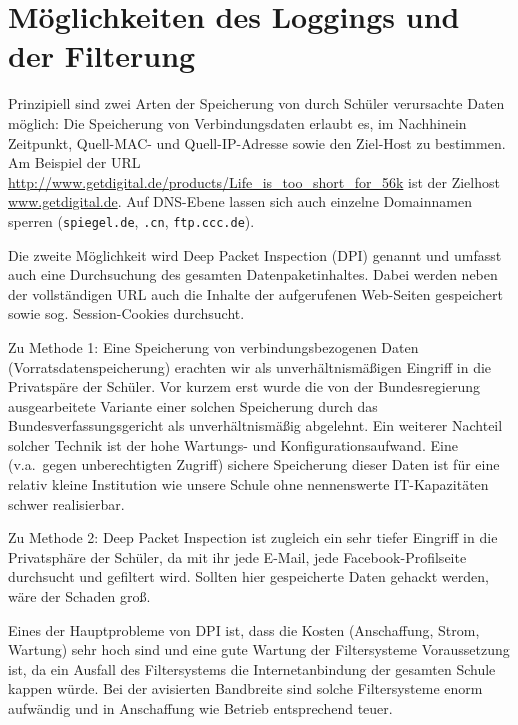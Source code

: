 \documentclass[10pt,a4paper,notitlepage]{scrartcl}
\begin{document}
\section{Möglichkeiten des Loggings und der Filterung}
\begin{multicols}{2}
Prinzipiell sind zwei Arten der Speicherung von durch Schüler verursachte Daten möglich: Die Speicherung von Verbindungsdaten erlaubt es, im Nachhinein Zeitpunkt, Quell-MAC- und Quell-IP-Adresse sowie den Ziel-Host zu bestimmen. Am Beispiel der URL \url{http://www.getdigital.de/products/Life_is_too_short_for_56k} ist der Zielhost \url{www.getdigital.de}. Auf DNS-Ebene lassen sich auch einzelne Domainnamen sperren (\nolinkurl{spiegel.de}, \nolinkurl{.cn}, \nolinkurl{ftp.ccc.de}).

Die zweite Möglichkeit wird Deep Packet Inspection (DPI) genannt und umfasst auch eine Durchsuchung des gesamten Datenpaketinhaltes. Dabei werden neben der vollständigen URL auch die Inhalte der aufgerufenen Web-Seiten gespeichert sowie sog. Session-Cookies durchsucht.

Zu Methode 1: Eine Speicherung von verbindungsbezogenen Daten (Vorratsdatenspeicherung) erachten wir als unverhältnismäßigen Eingriff in die Privatspäre der Schüler. Vor kurzem erst wurde die von der Bundesregierung ausgearbeitete Variante einer solchen Speicherung durch das Bundesverfassungsgericht als unverhältnismäßig abgelehnt. Ein weiterer Nachteil solcher Technik ist der hohe Wartungs- und Konfigurationsaufwand. Eine (v.a.\ gegen unberechtigten Zugriff) sichere Speicherung dieser Daten ist für eine relativ kleine Institution wie unsere Schule ohne nennenswerte IT-Kapazitäten schwer realisierbar.

Zu Methode 2: Deep Packet Inspection ist zugleich ein sehr tiefer Eingriff in die Privatsphäre der Schüler, da mit ihr jede E-Mail, jede Facebook-Profilseite durchsucht und gefiltert wird. Sollten hier gespeicherte Daten gehackt werden, wäre der Schaden groß.

Eines der Hauptprobleme von DPI ist, dass die Kosten (Anschaffung, Strom, Wartung) sehr hoch sind und eine gute Wartung der Filtersysteme Voraussetzung ist, da ein Ausfall des Filtersystems die Internetanbindung der gesamten Schule kappen würde. Bei der avisierten Bandbreite sind solche Filtersysteme enorm aufwändig und in Anschaffung wie Betrieb entsprechend teuer.


\end{multicols}
\end{document}
